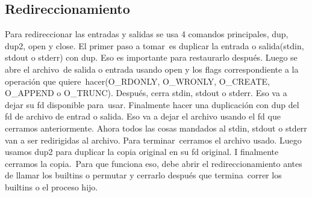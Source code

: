 \newpage
\subsection{Redireccionamiento}
Para redireccionar las entradas y salidas se usa 4 comandos principales, dup, dup2, open y close. El primer paso a tomar\
es duplicar la entrada o salida(stdin, stdout o stderr) con dup. Eso es importante para restaurarlo después. Luego se abre el archivo\
de salida o entrada usando open y los flags correspondiente a la operación que quiere\
hacer(O\_RDONLY, O\_WRONLY, O\_CREATE, O\_APPEND o O\_TRUNC). Después, cerra stdin, stdout o stderr. Eso va a dejar su fd disponible para\
usar. Finalmente hacer una duplicación con dup del fd de archivo de entrad o salida. Eso va a dejar el archivo usando el fd que
cerramos anteriormente. Ahora todos las cosas mandados al stdin, stdout o stderr van a ser redirigidas al archivo. Para terminar\
cerramos el archivo usado. Luego usamos dup2 para duplicar la copia original en su fd original. I finalmente cerramos la copia.\
Para que funciona eso, debe abrir el redireccionamiento antes de llamar los builtins o permutar y cerrarlo después que termina\
correr los builtins o el proceso hijo.

